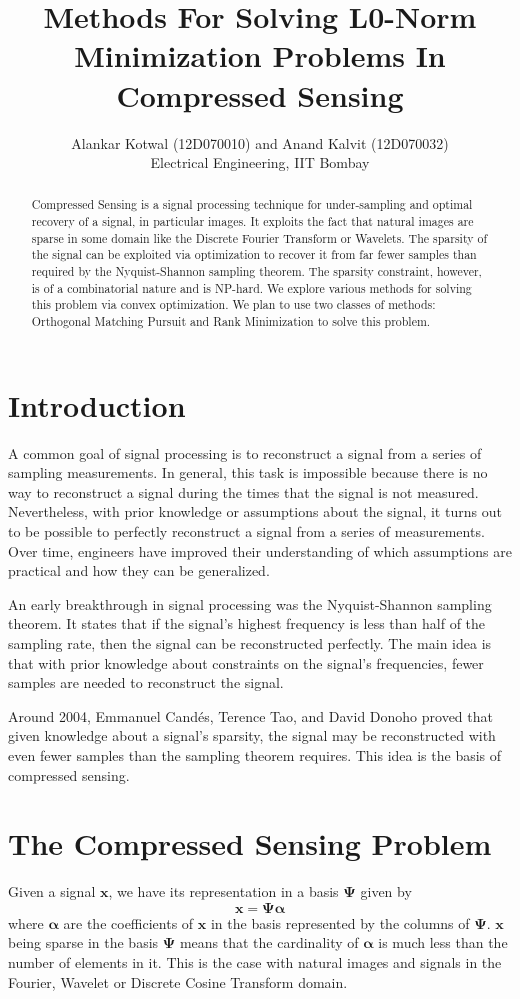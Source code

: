 \documentclass[letterpaper, 10 pt, conference]{article}
\title{\LARGE \bf
Methods For Solving L0-Norm Minimization Problems In Compressed Sensing
}
\author{Alankar Kotwal (12D070010) and Anand Kalvit (12D070032) \\ Electrical Engineering, IIT Bombay}
\begin{document}
\maketitle
\thispagestyle{empty}
\pagestyle{empty}

\begin{abstract}
Compressed Sensing is a signal processing technique for under-sampling and optimal recovery of a signal, in particular images. It exploits the fact that natural images are sparse in some domain like the Discrete Fourier Transform or Wavelets. The sparsity of the signal can be exploited via optimization to recover it from far fewer samples than required by the Nyquist-Shannon sampling theorem. The sparsity constraint, however, is of a combinatorial nature and is NP-hard. We explore various methods for solving this problem via convex optimization. We plan to use two classes of methods: Orthogonal Matching Pursuit and Rank Minimization to solve this problem.
\end{abstract}

\section{Introduction}
A common goal of signal processing is to reconstruct a signal from a series of sampling measurements. In general, this task is impossible because there is no way to reconstruct a signal during the times that the signal is not measured. Nevertheless, with prior knowledge or assumptions about the signal, it turns out to be possible to perfectly reconstruct a signal from a series of measurements. Over time, engineers have improved their understanding of which assumptions are practical and how they can be generalized.

An early breakthrough in signal processing was the Nyquist-Shannon sampling theorem. It states that if the signal's highest frequency is less than half of the sampling rate, then the signal can be reconstructed perfectly. The main idea is that with prior knowledge about constraints on the signal's frequencies, fewer samples are needed to reconstruct the signal.

Around 2004, Emmanuel Cand\'es, Terence Tao, and David Donoho proved that given knowledge about a signal's sparsity, the signal may be reconstructed with even fewer samples than the sampling theorem requires. This idea is the basis of compressed sensing.

\section{The Compressed Sensing Problem}
Given a signal $\mathbf{x}$, we have its representation in a basis $\mathbf{\Psi}$ given by
$$\mathbf{x} = \mathbf{\Psi \alpha}$$
where $\mathbf{\alpha}$ are the coefficients of $\mathbf{x}$ in the basis represented by the columns of $\mathbf{\Psi}$. $\mathbf{x}$ being sparse in the basis $\mathbf{\Psi}$ means that the cardinality of $\mathbf{\alpha}$ is much less than the number of elements in it. This is the case with natural images and signals in the Fourier, Wavelet or Discrete Cosine Transform domain. 
\end{document}
